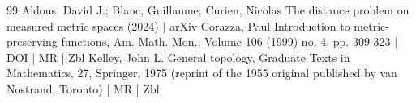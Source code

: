 \begin{thebibliography}{99}
 Aldous, David J.; Blanc, Guillaume; Curien, Nicolas The distance problem on measured metric spaces (2024) | arXiv
 Corazza, Paul Introduction to metric-preserving functions, Am. Math. Mon., Volume 106 (1999) no. 4, pp. 309-323 | DOI | MR | Zbl
 Kelley, John L. General topology, Graduate Texts in Mathematics, 27, Springer, 1975 (reprint of the 1955 original published by van Nostrand, Toronto) | MR | Zbl
\end{thebibliography}
